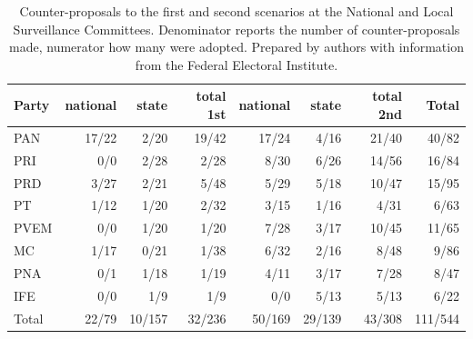 \documentclass[letter,12pt]{article}
\begin{document}
\begin{table}
\begin{center}
  \begin{tabular}{lrrr|rrr|r}
    Party & national & state  & total 1st & national& state  & total 2nd & Total \\ \hline
    PAN   & 17/22    & 2/20   & 19/42     & 17/24   & 4/16   & 21/40     & 40/82 \\
    PRI   & 0/0      & 2/28   & 2/28      & 8/30    & 6/26   & 14/56     & 16/84 \\
    PRD   & 3/27     & 2/21   & 5/48      & 5/29    & 5/18   & 10/47     & 15/95 \\
    PT    & 1/12     & 1/20   & 2/32      & 3/15    & 1/16   & 4/31      & 6/63 \\
    PVEM  & 0/0      & 1/20   & 1/20      & 7/28    & 3/17   & 10/45     & 11/65 \\
    MC    & 1/17     & 0/21   & 1/38      & 6/32    & 2/16   & 8/48      & 9/86 \\
    PNA   & 0/1      & 1/18   & 1/19      & 4/11    & 3/17   & 7/28      & 8/47 \\
    IFE   & 0/0      & 1/9    & 1/9       & 0/0     & 5/13   & 5/13      & 6/22 \\ \hline
    Total & 22/79    & 10/157 & 32/236    & 50/169  & 29/139 & 43/308    & 111/544 \\
  \end{tabular}
  \caption{Counter-proposals to the first and second scenarios at the National and Local Surveillance Committees. Denominator reports the number of counter-proposals made, numerator how many were adopted. Prepared by authors with information from the Federal Electoral Institute.}\label{T:counterprops}
\end{center}
\end{table}
\end{document}
